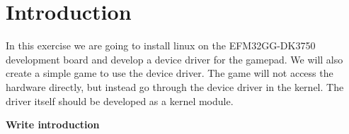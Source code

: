 \section{Introduction}
In this exercise we are going to install linux on the EFM32GG-DK3750 development board and develop a device driver for the gamepad. We will also create a simple game to use the device driver. The game will not access the hardware directly, but instead go through the device driver in the kernel. The driver itself should be developed as a kernel module. 

{\bf Write introduction}




